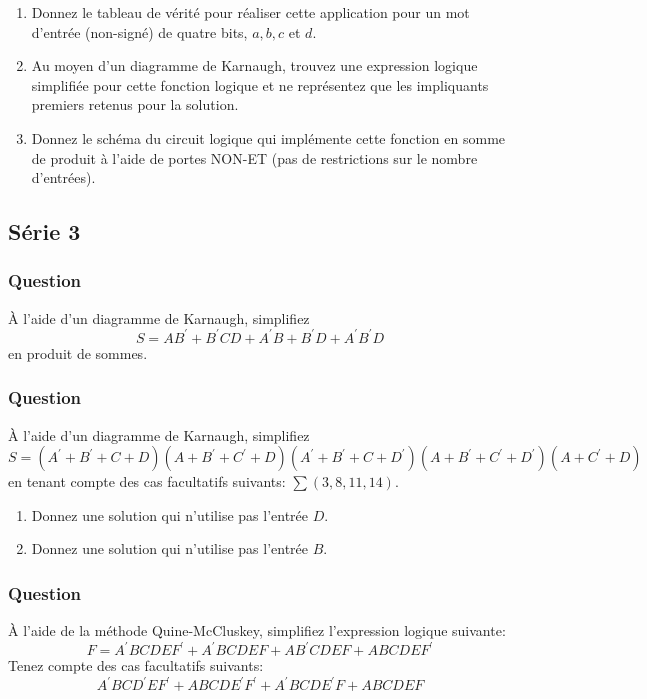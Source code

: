 \documentclass[11pt]{article}
\begin{document}
\begin{enumerate}
\item Donnez le tableau de vérité pour réaliser cette application pour
un mot d'entrée (non-signé) de quatre bits, \(a, b, c\) et \(d\).

\item Au moyen d'un diagramme de Karnaugh, trouvez une expression
logique simplifiée pour cette fonction logique et ne représentez
que les impliquants premiers retenus pour la solution.

\item Donnez le schéma du circuit logique qui implémente cette fonction
en somme de produit à l'aide de portes NON-ET (pas de restrictions
sur le nombre d'entrées).
\end{enumerate}

\subsection*{Série 3}
\label{sec:org14d3961}
\subsubsection*{Question}
\label{sec:org451921c}
À l'aide d'un diagramme de Karnaugh, simplifiez 
  $$
    S = A B^\prime +
    B^\prime CD + A^\prime B + B^\prime D + A^\prime B^\prime D
    $$
  en produit de sommes.

\subsubsection*{Question}
\label{sec:orgca603e4}
À l'aide d'un diagramme de Karnaugh, simplifiez 
  $$
    S = ( A^\prime +
    B^\prime + C + D)(A+B^\prime +C^\prime +D)(A^\prime +B^\prime
    +C+D^\prime )(A+B^\prime +C^\prime +D^\prime )(A+C^\prime +D)
    $$
  en tenant compte des cas facultatifs suivants: \(\sum(3,8,11,14)\).
\begin{enumerate}
\item Donnez une solution qui n'utilise pas l'entrée \(D\).
\item Donnez une solution qui n'utilise pas l'entrée \(B\).
\end{enumerate}

\subsubsection*{Question}
\label{sec:orgf1af723}
À l'aide de la méthode Quine-McCluskey, simplifiez l'expression
  logique suivante: 
  $$
    F= A^\prime BCDEF^\prime  + A^\prime BCDEF+ AB^\prime CDEF+ ABCDEF^\prime 
    $$
  Tenez compte des cas facultatifs suivants: 
  $$
    A^\prime BCD^\prime EF^\prime +
    ABCDE^\prime F^\prime + A^\prime BCDE^\prime F+ ABCDEF
    $$
\end{document}
